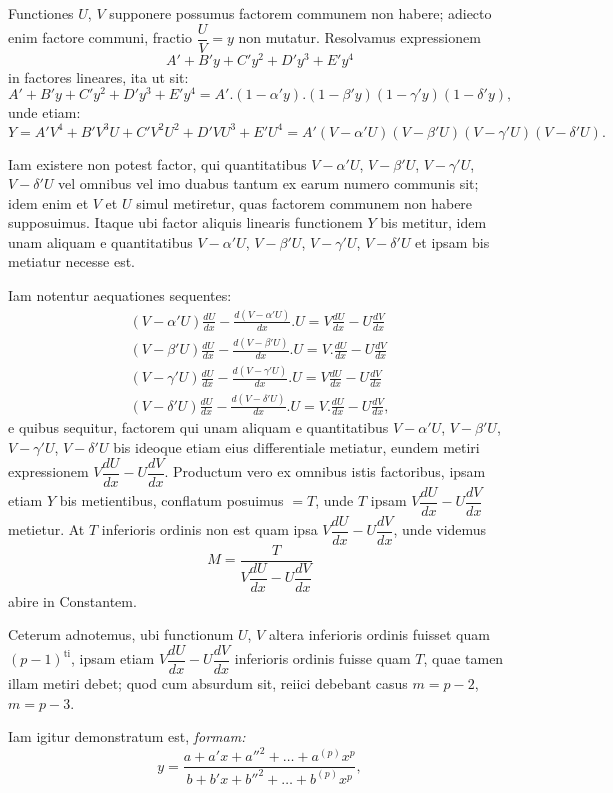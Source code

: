 \documentclass{article}
\begin{document}
Functiones $U$, $V$ supponere possumus factorem communem non habere; adiecto enim factore communi, fractio $\dfrac{U}{V}=y$ non mutatur. Resolvamus expressionem
\[
A'+B'y+C'y^{2}+D'y^{3}+E'y^{4}
\]
in factores lineares, ita ut sit:
\[
A'+B'y+C'y^{2}+D'y^{3}+E'y^{4}=A'.(1-\alpha'y).(1-\beta'y)(1-\gamma'y)(1-\delta'y),
\]
unde etiam:
\[
Y=A'V^{4}+B'V^{3}U+C'V^{2}U^{2}+D'VU^{3}+E'U^{4}=A'(V-\alpha'U)(V-\beta'U)(V-\gamma'U)(V-\delta'U).
\]


Iam existere non potest factor, qui quantitatibus $V-\alpha'U$, $V-\beta'U$, $V-\gamma'U$, $V-\delta'U$ vel omnibus vel imo duabus tantum ex earum numero communis sit; idem enim et $V$ et $U$ simul metiretur, quas factorem communem non habere supposuimus. Itaque ubi factor aliquis linearis functionem $Y$ bis metitur, idem unam aliquam e quantitatibus $V-\alpha'U$, $V-\beta'U$, $V-\gamma'U$, $V-\delta'U$ et ipsam bis metiatur necesse est.

Iam notentur aequationes sequentes:
\[
\begin{gathered}
(V-\alpha'U)\frac{dU}{dx}-\frac{d(V-\alpha'U)}{dx}.U=V\frac{dU}{dx}-U\frac{dV}{dx}\\
(V-\beta'U)\frac{dU}{dx}-\frac{d(V-\beta'U)}{dx}.U=V.\frac{dU}{dx}-U\frac{dV}{dx}\\
(V-\gamma'U)\frac{dU}{dx}-\frac{d(V-\gamma'U)}{dx}.U=V\frac{dU}{dx}-U\frac{dV}{dx}\\
(V-\delta'U)\frac{dU}{dx}-\frac{d(V-\delta'U)}{dx}.U=V.\frac{dU}{dx}-U\frac{dV}{dx},
\end{gathered}
\]
e quibus sequitur, factorem qui unam aliquam e quantitatibus $V-\alpha'U$, $V-\beta'U$, $V-\gamma'U$, $V-\delta'U$ bis ideoque etiam eius differentiale metiatur, eundem metiri expressionem $V\dfrac{dU}{dx}-U\dfrac{dV}{dx}$. Productum vero ex omnibus istis factoribus, ipsam etiam $Y$ bis metientibus, conflatum posuimus $=T$, unde $T$ ipsam $V\dfrac{dU}{dx}-U\dfrac{dV}{dx}$ metietur. At $T$ inferioris ordinis non est quam ipsa $V\dfrac{dU}{dx}-U\dfrac{dV}{dx}$, unde videmus
\[
M=\frac{T}{V\dfrac{dU}{dx}-U\dfrac{dV}{dx}}
\]
abire in Constantem.

Ceterum adnotemus, ubi functionum $U$, $V$ altera inferioris ordinis fuisset quam $(p-1)^{\mathrm{ti}}$, ipsam etiam $V\dfrac{dU}{dx}-U\dfrac{dV}{dx}$ inferioris ordinis fuisse quam $T$, quae tamen illam metiri debet; quod cum absurdum sit, reiici debebant casus $m=p-2$, $m=p-3$.

Iam igitur demonstratum est, \emph{formam:}
\[
y=\frac{a+a'x+a''^{2}+\ldots+a^{(p)}x^{p}}{b+b'x+b''^{2}+\ldots+b^{(p)}x^{p}},
\]
\end{document}

